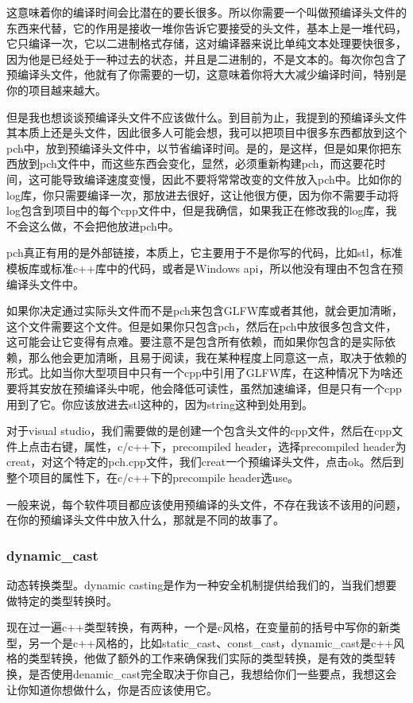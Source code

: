 这意味着你的编译时间会比潜在的要长很多。所以你需要一个叫做预编译头文件的东西来代替，它的作用是接收一堆你告诉它要接受的头文件，基本上是一堆代码，它只编译一次，它以二进制格式存储，这对编译器来说比单纯文本处理要快很多，因为他是已经处于一种过去的状态，并且是二进制的，不是文本的。每次你包含了预编译头文件，他就有了你需要的一切，这意味着你将大大减少编译时间，特别是你的项目越来越大。

但是我也想谈谈预编译头文件不应该做什么。到目前为止，我提到的预编译头文件其本质上还是头文件，因此很多人可能会想，我可以把项目中很多东西都放到这个pch中，放到预编译头文件中，以节省编译时间。是的，是这样，但是如果你把东西放到pch文件中，而这些东西会变化，显然，必须重新构建pch，而这要花时间，这可能导致编译速度变慢，因此不要将常常改变的文件放入pch中。比如你的log库，你只需要编译一次，那放进去很好，这让他很方便，因为你不需要手动将log包含到项目中的每个cpp文件中，但是我确信，如果我正在修改我的log库，我不会这么做，不会把他放进pch中。

pch真正有用的是外部链接，本质上，它主要用于不是你写的代码，比如stl，标准模板库或标准c++库中的代码，或者是Windows api，所以他没有理由不包含在预编译头文件中。

如果你决定通过实际头文件而不是pch来包含GLFW库或者其他，就会更加清晰，这个文件需要这个文件。但是如果你只包含pch，然后在pch中放很多包含文件，这可能会让它变得有点难。要注意不是包含所有依赖，而如果你包含的是实际依赖，那么他会更加清晰，且易于阅读，我在某种程度上同意这一点，取决于依赖的形式。比如当你大型项目中只有一个cpp中引用了GLFW库，在这种情况下为啥还要将其安放在预编译头中呢，他会降低可读性，虽然加速编译，但是只有一个cpp用到了它。你应该放进去stl这种的，因为string这种到处用到。

对于visual studio，我们需要做的是创建一个包含头文件的cpp文件，然后在cpp文件上点击右键，属性，c/c++下，precompiled header，选择precompiled header为creat，对这个特定的pch.cpp文件，我们creat一个预编译头文件，点击ok。然后到整个项目的属性下，在c/c++下的precompile header选use。

一般来说，每个软件项目都应该使用预编译的头文件，不存在我该不该用的问题，在你的预编译头文件中放入什么，那就是不同的故事了。

\subsubsection{dynamic_cast}


动态转换类型。{\ncodestyle dynamic casting}是作为一种安全机制提供给我们的，当我们想要做特定的类型转换时。

现在过一遍c++类型转换，有两种，一个是c风格，在变量前的括号中写你的新类型，另一个是c++风格的，比如{\ncodestyle static_cast}、{\ncodestyle const_cast}，{\ncodestyle dynamic_cast}是c++风格的类型转换，他做了额外的工作来确保我们实际的类型转换，是有效的类型转换，是否使用{\ncodestyle denamic_cast}完全取决于你自己，我想给你们一些要点，我想这会让你知道你想做什么，你是否应该使用它。

